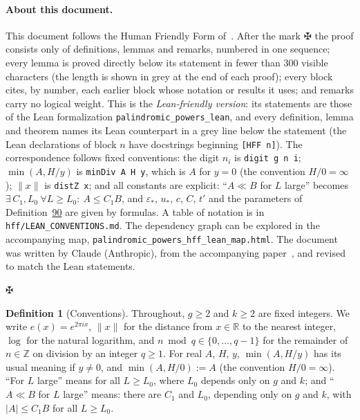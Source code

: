 \documentclass[11pt]{article}
\theoremstyle{definition}\newtheorem{hffdef}[hffc]{Definition}
\theoremstyle{plain}\newtheorem{hfflem}[hffc]{Lemma}\newtheorem{hffthm}[hffc]{Theorem}
\theoremstyle{remark}\newtheorem{hffrem}[hffc]{Remark}
\newcommand{\HFFmark}{\par\medskip\begin{center}{\Large$\maltese$}\end{center}\medskip\par}
\newcommand{\Z}{\mathbb{Z}}\newcommand{\R}{\mathbb{R}}\newcommand{\N}{\mathbb{N}}
\begin{document}
\paragraph{About this document.} This document follows the Human Friendly Form of~\cite{HFF}. After the mark $\maltese$ the proof consists only of definitions, lemmas and remarks, numbered in one sequence; every lemma is proved directly below its statement in fewer than $300$ visible characters (the length is shown in grey at the end of each proof); every block cites, by number, each earlier block whose notation or results it uses; and remarks carry no logical weight. This is the \emph{Lean-friendly version}: its statements are those of the Lean formalization \texttt{palindromic\_powers\_lean}, and every definition, lemma and theorem names its Lean counterpart in a grey line below the statement (the Lean declarations of block $n$ have docstrings beginning \texttt{[HFF n]}). The correspondence follows fixed conventions: the digit $n_i$ is \texttt{digit g n i}; $\min(A,H/y)$ is \texttt{minDiv A H y}, which is $A$ for $y=0$ (the convention $H/0=\infty$); $\|x\|$ is \texttt{distZ x}; and all constants are explicit: ``$A\ll B$ for $L$ large'' becomes $\exists\,C_1,L_0\ \forall L\ge L_0:\ A\le C_1B$, and $\varepsilon_*$, $u_*$, $c$, $C$, $t'$ and the parameters of Definition~\hyperref[D:par]{90} are given by formulas. A table of notation is in \texttt{hff/LEAN\_CONVENTIONS.md}. The dependency graph can be explored in the accompanying map, \texttt{palindromic\_powers\_hff\_lean\_map.html}. The document was written by Claude (Anthropic), from the accompanying paper~\cite{Pal}, and revised to match the Lean statements.

\HFFmark

\begin{hffdef}[Conventions]\label{D:conv}
Throughout, $g\ge2$ and $k\ge2$ are fixed integers. We write $e(x)=e^{2\pi ix}$, $\|x\|$ for the distance from $x\in\R$ to the nearest integer, $\log$ for the natural logarithm, and $n\bmod q\in\{0,\dots,q-1\}$ for the remainder of $n\in\Z$ on division by an integer $q\ge1$. For real $A$, $H$, $y$, $\min(A,H/y)$ has its usual meaning if $y\ne0$, and $\min(A,H/0):=A$ (the convention $H/0=\infty$). ``For $L$ large'' means for all $L\ge L_0$, where $L_0$ depends only on $g$ and $k$; and ``$A\ll B$ for $L$ large'' means: there are $C_1$ and $L_0$, depending only on $g$ and $k$, with $|A|\le C_1B$ for all $L\ge L_0$.
\par\nopagebreak{}
\end{hffdef}
\end{document}

